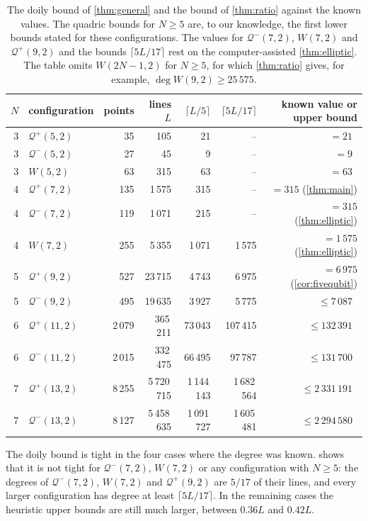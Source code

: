 \documentclass[11pt]{article}
\theoremstyle{definition}
\theoremstyle{remark}
\newcommand{\Qp}{\mathcal{Q}^{+}}
\newcommand{\Qm}{\mathcal{Q}^{-}}
\newcommand{\dg}{\operatorname{deg}}
\begin{document}
\begin{table}[ht]
\centering\small
\begin{tabular}{@{}rlrrrrr@{}}
\toprule
$N$ & configuration & points & lines $L$ & $\lceil L/5\rceil$ & $\lceil 5L/17\rceil$ & known value or upper bound \\
\midrule
3 & $\Qp(5,2)$ & 35 & 105 & 21 & -- & $=21$~\cite{deBoutray22} \\
3 & $\Qm(5,2)$ & 27 & 45 & 9 & -- & $=9$~\cite{deBoutray22} \\
3 & $W(5,2)$ & 63 & 315 & 63 & -- & $=63$~\cite{Muller23,Saniga24hex} \\
4 & $\Qp(7,2)$ & 135 & 1\,575 & 315 & -- & $=315$ (\cref{thm:main}) \\
4 & $\Qm(7,2)$ & 119 & 1\,071 & 215 & -- & $=315$ (\cref{thm:elliptic}) \\
4 & $W(7,2)$ & 255 & 5\,355 & 1\,071 & 1\,575 & $=1\,575$ (\cref{thm:elliptic}) \\
5 & $\Qp(9,2)$ & 527 & 23\,715 & 4\,743 & 6\,975 & $=6\,975$ (\cref{cor:fivequbit}) \\
5 & $\Qm(9,2)$ & 495 & 19\,635 & 3\,927 & 5\,775 & $\le7\,087$~\cite{Muller24} \\
6 & $\Qp(11,2)$ & 2\,079 & 365\,211 & 73\,043 & 107\,415 & $\le132\,391$~\cite{Muller24} \\
6 & $\Qm(11,2)$ & 2\,015 & 332\,475 & 66\,495 & 97\,787 & $\le131\,700$~\cite{Muller24} \\
7 & $\Qp(13,2)$ & 8\,255 & 5\,720\,715 & 1\,144\,143 & 1\,682\,564 & $\le2\,331\,191$~\cite{Muller24} \\
7 & $\Qm(13,2)$ & 8\,127 & 5\,458\,635 & 1\,091\,727 & 1\,605\,481 & $\le2\,294\,580$~\cite{Muller24} \\
\bottomrule
\end{tabular}
\caption{The doily bound of \cref{thm:general} and the bound of \cref{thm:ratio} against the known values. The quadric bounds for $N\ge5$ are, to our knowledge, the first lower bounds stated for these configurations. The values for $\Qm(7,2)$, $W(7,2)$ and $\Qp(9,2)$ and the bounds $\lceil 5L/17\rceil$ rest on the computer-assisted \cref{thm:elliptic}. The table omits $W(2N-1,2)$ for $N\ge5$, for which \cref{thm:ratio} gives, for example, $\dg W(9,2)\ge25\,575$.}
\label{tab:general}
\end{table}

The doily bound is tight in the four cases where the degree was known.
 shows that it is not tight for $\Qm(7,2)$, $W(7,2)$ or any configuration with $N\ge5$: the degrees of $\Qm(7,2)$, $W(7,2)$ and $\Qp(9,2)$ are $5/17$ of their lines, and every larger configuration has degree at least $\lceil 5L/17\rceil$.
In the remaining cases the heuristic upper bounds are still much larger, between $0.36L$ and $0.42L$.
\end{document}
